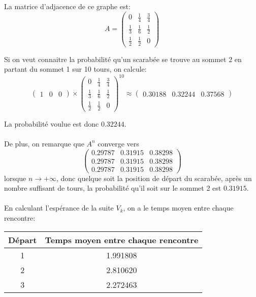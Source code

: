     La matrice d'adjacence de ce graphe est:
      \[A = \left(\begin{array}{ccc}
        0 & \frac 1 4 & \frac 3 4 \\
        \frac 1 3 & \frac 1 6 & \frac 1 2 \\
        \frac 1 2 & \frac 1 2 & 0
      \end{array}\right)\]

    Si on veut connaitre la probabilité qu'un scarabée se trouve au sommet 2 en
    partant du sommet 1 sur 10 tours, on calcule:
      \[
        \left(\begin{array}{ccc}
          1 & 0 & 0
        \end{array}\right)
        \times
        \left(\begin{array}{ccc}
          0 & \frac 1 4 & \frac 3 4 \\
          \frac 1 3 & \frac 1 6 & \frac 1 2 \\
          \frac 1 2 & \frac 1 2 & 0
        \end{array}\right)^{10}
        \approx
        \left(\begin{array}{ccc}
          0.30188 & 0.32244 & 0.37568
        \end{array}\right)
      \]

    La probabilité voulue est donc $0.32244$.

    \paragraph{}
    De plus, on remarque que $A^n$ converge vers
      \[
        \left(\begin{array}{ccc}
          0.29787 & 0.31915 & 0.38298 \\
          0.29787 & 0.31915 & 0.38298 \\
          0.29787 & 0.31915 & 0.38298
        \end{array}\right)
      \]
    lorsque $n \to +\infty$, donc quelque soit la position de départ du
    scarabée, après un nombre suffisant de tours, la probabilité qu'il soit sur
    le sommet 2 est $0.31915$.

    \paragraph{}
    En calculant l'espérance de la suite $V_k$, on a le temps moyen entre chaque
    rencontre:

    \begin{center}
      \begin{tabular}{|c|c|}
        \hline
        Départ & Temps moyen entre chaque rencontre \\\hline
        1      & 1.991808 \\\hline
        2      & 2.810620 \\\hline
        3      & 2.272463 \\\hline
      \end{tabular}
    \end{center}

